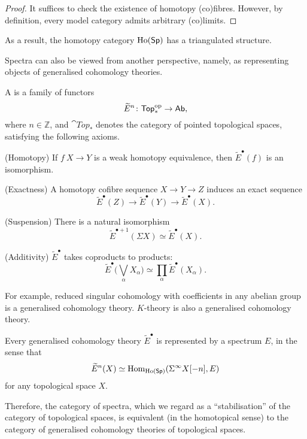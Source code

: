 \begin{proof}
    It suffices to check the existence of homotopy (co)fibres.
    However, by definition, every model category admits arbitrary (co)limits.
\end{proof}

As a result, the homotopy category $\operatorname{Ho}(\mathsf{Sp})$
has a triangulated structure.

Spectra can also be viewed from another perspective,
namely, as representing objects of generalised cohomology theories.

\begin{definition}
    A 
    is a family of functors
    \[ \widetilde E^n\colon\mathsf{Top}^{\mathrm{op}}_*\to\mathsf{Ab}, \]
    where $n\in\mathbb Z$,
    and $\cat{Top}_*$ denotes the category of pointed topological spaces,
    satisfying the following axioms.
    \begin{itms}
        \item \textup{(Homotopy)} If $f\:X\to Y$ is a weak homotopy equivalence,
        then $\widetilde E^\bullet(f)$ is an isomorphism.
        \item \textup{(Exactness)} A homotopy cofibre sequence $X\to Y\to Z$ induces an exact sequence
        \[ \widetilde E^\bullet(Z)\to\widetilde E^\bullet(Y)\to\widetilde E^\bullet(X). \]
        \item \textup{(Suspension)} There is a natural isomorphism
        \[ \widetilde E^{\bullet+1}(\Sigma X)\simeq\widetilde E^\bullet(X). \]
        \item \textup{(Additivity)} $\widetilde E^\bullet$ takes coproducts to products:
        \[\textstyle \widetilde E^\bullet\bigl(\bigvee_\alpha X_\alpha\bigr)\simeq
        \prod_\alpha\widetilde E^\bullet(X_\alpha). \]
    \end{itms}
\end{definition}

For example, reduced singular cohomology with coefficients in any abelian group 
is a generalised cohomology theory.
$K$-theory is also a generalised cohomology theory.

\begin{theorem}[Brown]
    Every generalised cohomology theory $\widetilde{E}^\bullet$
    is represented by a spectrum $E$, in the sense that 
    \[\widetilde{E}^n(X)\simeq\operatorname{Hom}_{\operatorname{Ho}(\mathsf{Sp})}(\Sigma^\infty X[-n],E)\]
    for any topological space $X$.
\end{theorem}

Therefore, the category of spectra,
which we regard as a ``stabilisation'' of the category of topological spaces,
is equivalent (in the homotopical sense)
to the category of generalised cohomology theories of topological spaces.

